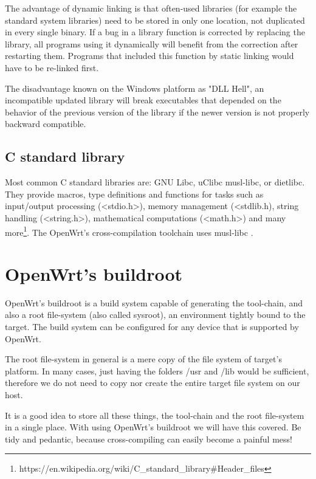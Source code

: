 The advantage of dynamic linking is that often-used libraries (for example the standard system libraries) need to be stored in only one location, not duplicated in every single binary.
If a bug in a library function is corrected by replacing the library, all programs using it dynamically will benefit from the correction after restarting them.
Programs that included this function by static linking would have to be re-linked first.

The disadvantage known on the Windows platform as "DLL Hell", an incompatible updated library will break executables that depended on the behavior of the previous version of the library if the newer version is not properly backward compatible\cite{compiler}.



\subsection{C standard library}

Most common C standard libraries are: GNU Libc, uClibc musl-libc, or dietlibc.
They provide macros, type definitions and functions for tasks such as input/output processing (<stdio.h>), memory management (<stdlib.h), string handling (<string.h>), mathematical computations (<math.h>) and many more\footnote{https://en.wikipedia.org/wiki/C\_standard\_library\#Header\_files}.
The OpenWrt's cross-compilation toolchain uses musl-libc \cite{c_library}.



\section{OpenWrt's buildroot}

OpenWrt's buildroot is a build system capable of generating the tool-chain, and also a root file-system (also called sysroot), an environment tightly bound to the target.
The build system can be configured for any device that is supported by OpenWrt. %

The root file-system in general is a mere copy of the file system of target's platform.
In many cases, just having the folders /usr and /lib would be sufficient, therefore we do not need to copy nor create the entire target file system on our host.

It is a good idea to store all these things, the tool-chain and the root file-system in a single place.
With using OpenWrt's buildroot we will have this covered.
Be tidy and pedantic, because cross-compiling can easily become a painful mess!\cite{fabrizio}




